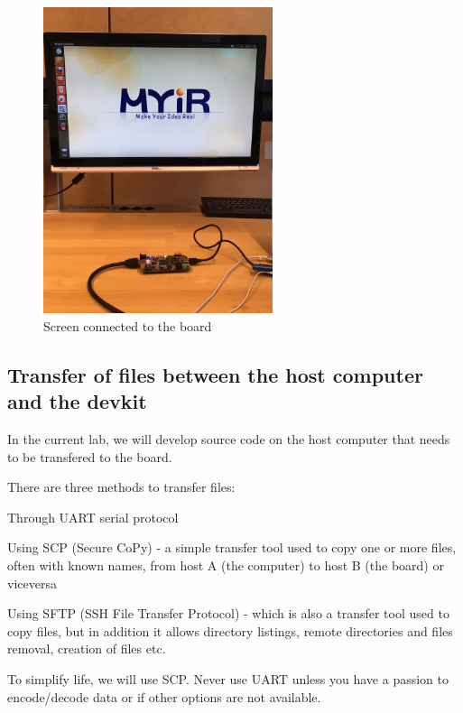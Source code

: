 \begin{figure}[h!]
    \centering
    \includegraphics[width=0.6\textwidth]{img/hdmi.JPG}
    \caption{Screen connected to the board}
    \label{fig:hdmi}
\end{figure}


\clearpage
\subsection{Transfer of files between the host computer and the devkit}

In the current lab, we will develop source code on the host computer that needs to be transfered to the board.

There are three methods to transfer files:
\begin{myitemize}
\item Through UART serial protocol
\item Using SCP (Secure CoPy) - a simple transfer tool used to copy one or more files, often with known names, from host A (the computer) to host B (the board) or viceversa
\item Using SFTP (SSH File Transfer Protocol) - which is also a transfer tool used to copy files, but in addition it allows directory listings, remote directories and files removal, creation of files etc.
\end{myitemize}

To simplify life, we will use SCP. Never use UART unless you have a passion to encode/decode data or if other options are not available.

